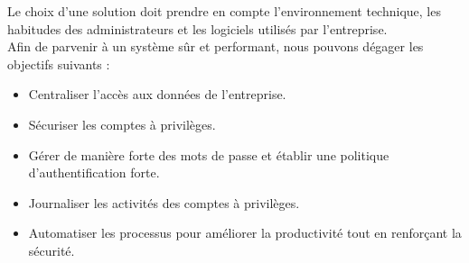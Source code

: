 Le choix d’une solution doit prendre en compte l’environnement technique, les habitudes des administrateurs et les logiciels utilisés par l’entreprise.\\
Afin de parvenir à un système sûr et performant, nous pouvons dégager les objectifs suivants :
\begin{itemize}
	\item Centraliser l’accès aux données de l’entreprise.
	\item Sécuriser les comptes à privilèges.
	\item Gérer de manière forte des mots de passe et établir une politique d’authentification forte.
	\item Journaliser les activités des comptes à privilèges.
	\item Automatiser les processus pour améliorer la productivité tout en renforçant la sécurité.
\end{itemize}